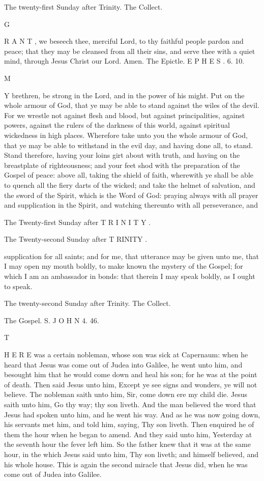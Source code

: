 The twenty-first Sunday after Trinity. The Collect.

G

R A N T , we beseech thee, merciful Lord, to thy faithful people pardon and peace; that they may be cleansed from all their sins, and serve thee with a quiet mind, through Jesus Christ our Lord. Amen. The Epictle. E P H E S . 6. 10.

M

Y brethren, be strong in the Lord, and in the power of his might. Put on the whole armour of God, that ye may be able to stand against the wiles of the devil. For we wrestle not against flesh and blood, but against principalities, against powers, against the rulers of the darkness of this world, against spiritual wickedness in high places. Wherefore take unto you the whole armour of God, that ye may be able to withstand in the evil day, and having done all, to stand. Stand therefore, having your loins girt about with truth, and having on the breastplate of righteousness; and your feet shod with the preparation of the Gospel of peace: above all, taking the shield of faith, wherewith ye shall be able to quench all the fiery darts of the wicked; and take the helmet of salvation, and the sword of the Spirit, which is the Word of God: praying always with all prayer and supplication in the Spirit, and watching thereunto with all perseverance, and

The Twenty-first Sunday after T R I N I T Y .

The Twenty-second Sunday after T RINITY .

supplication for all saints; and for me, that utterance may be given unto me, that I may open my mouth boldly, to make known the mystery of the Gospel; for which I am an ambassador in bonds: that therein I may speak boldly, as I ought to speak.

The twenty-second Sunday after Trinity. The Collect.

The Gospel. S. J O H N 4. 46.

T

H E R E was a certain nobleman, whose son was sick at Capernaum: when he heard that Jesus was come out of Judea into Galilee, he went unto him, and besought him that he would come down and heal his son; for he was at the point of death. Then said Jesus unto him, Except ye see signs and wonders, ye will not believe. The nobleman saith unto him, Sir, come down ere my child die. Jesus saith unto him, Go thy way; thy son liveth. And the man believed the word that Jesus had spoken unto him, and he went his way. And as he was now going down, his servants met him, and told him, saying, Thy son liveth. Then enquired he of them the hour when he began to amend. And they said unto him, Yesterday at the seventh hour the fever left him. So the father knew that it was at the same hour, in the which Jesus said unto him, Thy son liveth; and himself believed, and his whole house. This is again the second miracle that Jesus did, when he was come out of Judea into Galilee.

